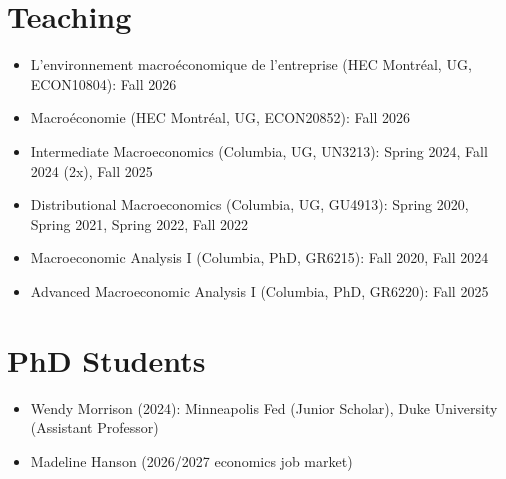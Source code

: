 \documentclass[a4paper,10pt]{article}
\begin{document}
\section*{Teaching}
\begin{itemize}
  \item L'environnement macro\'economique de l'entreprise (HEC Montr\'eal, UG, ECON10804): Fall 2026
  \item Macro\'economie (HEC Montr\'eal, UG, ECON20852): Fall 2026
  \item Intermediate Macroeconomics (Columbia, UG, UN3213): Spring 2024, Fall 2024 (2x), Fall 2025
  \item Distributional Macroeconomics (Columbia, UG, GU4913): Spring 2020, Spring 2021, Spring 2022, Fall 2022
  \item Macroeconomic Analysis I (Columbia, PhD, GR6215): Fall 2020, Fall 2024
  \item Advanced Macroeconomic Analysis I (Columbia, PhD, GR6220): Fall 2025
\end{itemize}

\section*{PhD Students}
\begin{itemize}
  \item Wendy Morrison (2024): Minneapolis Fed (Junior Scholar), Duke University (Assistant Professor)
  \item Madeline Hanson (2026/2027 economics job market)
\end{itemize}
\end{document}
